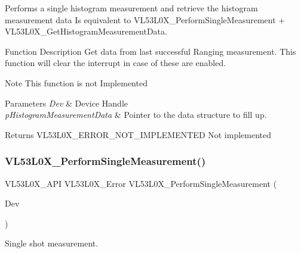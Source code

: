 Performs a single histogram measurement and retrieve the histogram measurement data Is equivalent to V\+L53\+L0\+X\+\_\+\+Perform\+Single\+Measurement + V\+L53\+L0\+X\+\_\+\+Get\+Histogram\+Measurement\+Data. 

\begin{DoxyParagraph}{Function Description}
Get data from last successful Ranging measurement. This function will clear the interrupt in case of these are enabled.
\end{DoxyParagraph}
\begin{DoxyNote}{Note}
This function is not Implemented
\end{DoxyNote}

\begin{DoxyParams}{Parameters}
{\em Dev} & Device Handle \\
\hline
{\em p\+Histogram\+Measurement\+Data} & Pointer to the data structure to fill up. \\
\hline
\end{DoxyParams}
\begin{DoxyReturn}{Returns}
V\+L53\+L0\+X\+\_\+\+E\+R\+R\+O\+R\+\_\+\+N\+O\+T\+\_\+\+I\+M\+P\+L\+E\+M\+E\+N\+T\+ED Not implemented 
\end{DoxyReturn}
\mbox{\label{group__VL53L0X__measurement__group_gad56ed8d1403da5d203e2418a1f57fa81}} 
\subsubsection{\texorpdfstring{V\+L53\+L0\+X\+\_\+\+Perform\+Single\+Measurement()}{VL53L0X\_PerformSingleMeasurement()}}
{\footnotesize\ttfamily V\+L53\+L0\+X\+\_\+\+A\+PI V\+L53\+L0\+X\+\_\+\+Error V\+L53\+L0\+X\+\_\+\+Perform\+Single\+Measurement (\begin{DoxyParamCaption}\item[{\hyperlink{group__VL53L0X__platform__group_ga2d6405308b1dd524b462f1b8fb97d167}{V\+L53\+L0\+X\+\_\+\+D\+EV}}]{Dev }\end{DoxyParamCaption})}



Single shot measurement. 

